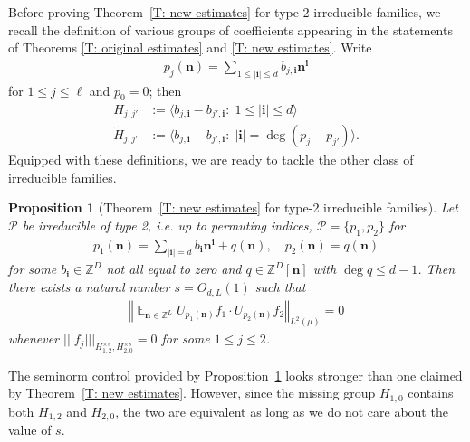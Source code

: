 \documentclass[11pt]{amsart}
\newtheorem{proposition}[lemma]{Proposition}
\theoremstyle{definition}
\DeclareMathOperator*{\E}{\mathbb{E}}
\newcommand{\Z}{{\mathbb Z}}
\newcommand{\CP}{{\mathcal P}}
\newcommand{\bn}{{\mathbf{n}}}
\newcommand{\norm}[1]{\left\Vert #1\right\Vert}
\newcommand{\nnorm}[1]{\lvert\!|\!| #1|\!|\!\rvert}
\newcommand{\1}{{\mathbf{1}}}
\newcommand{\bi}{{\textbf{i}}}
\begin{document}
Before proving Theorem~\ref{T: new estimates} for type-2 irreducible families, we recall the definition of various groups of coefficients appearing in the statements of Theorems \ref{T: original estimates} and \ref{T: new estimates}. %
Write
\begin{align}\label{E: p_j}
    p_j(\bn) = \sum\limits_{1\leq\vert\bi\vert\leq d} b_{j,\bi}\bn^\bi
\end{align}
for $1\leq j\leq \ell$ and $p_0 = 0$; then 
\begin{align}\label{E: H}
    H_{j,j'}&:=\langle b_{j,\bi}-b_{j',\bi}\colon\; 1\leq \vert\bi\vert\leq d \rangle\\
    \label{E: tilde H}
    \tilde H_{j,j'}&:=\langle b_{j,\bi}-b_{j',\bi}\colon\; \vert\bi\vert = \deg (p_j-p_{j'}) \rangle.
\end{align}
Equipped with these definitions, we are ready to tackle the other class of irreducible families.
\begin{proposition}[Theorem~\ref{T: new estimates} for type-2 irreducible families]\label{P: type 2}
    Let $\CP$ be irreducible of type 2, i.e. up to permuting indices, $\CP = \{p_1,p_2\}$ for 
    \begin{align*}
    p_1(\bn) = \sum_{\vert\bi\vert=d} b_{\bi} \bn^\bi+q(\bn), \quad p_2(\bn) = q(\bn) 
    \end{align*}
     for some $b_{\bi}\in\Z^D$ not all equal to zero and $q\in\Z^{D}[\bn]$ with $\deg q\leq d-1$. Then there exists a natural number $s=O_{d,L}(1)$ such that
    \begin{align*}
        \norm{\E_{\bn\in\Z^{L}}U_{p_1(\bn)}f_1\cdot U_{p_2(\bn)}f_2}_{L^2(\mu)} = 0
    \end{align*}
    whenever $\nnorm{f_j}_{H_{1,2}^{\times s}, H_{2,0}^{\times s}} = 0$ for some $1\leq j\leq 2$.
\end{proposition}
The seminorm control provided by Proposition~\ref{P: type 2} looks stronger than one claimed by Theorem~\ref{T: new estimates}. However, since the missing group $H_{1,0}$ contains both $H_{1,2}$ and $H_{2,0}$, the two are equivalent as long as we do not care about the value of $s$. 
\end{document}
